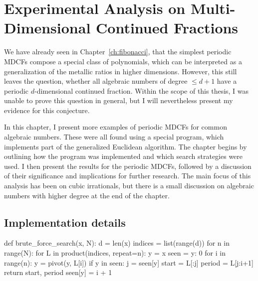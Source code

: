 \chapter{Experimental Analysis on Multi-Dimensional Continued Fractions}
\label{ch:implementation}

We have already seen in Chapter~\ref{ch:fibonacci},
that the simplest periodic MDCFs compose a special class of polynomials,
which can be interpreted as a generalization of the metallic ratios in higher
dimensions.
However, this still leaves the question, whether all algebraic numbers of degree $≤ d+1$
have a periodic $d$-dimensional continued fraction.
Within the scope of this thesis, I was unable to prove this question in
general, but I will nevertheless present my evidence for this conjecture.

In this chapter, I present more examples of periodic MDCFs for common algebraic numbers.
These were all found using a special program, which implements part of the generalized Euclidean algorithm.
The chapter begins by outlining how the program was implemented and which search strategies were used.
I then present the results for the periodic MDCFs, followed by a discussion of
their significance and implications for further research.
The main focus of this analysis has been on cubic irrationals,
but there is a small discussion on algebraic numbers with higher degree at the end of the chapter.

\section{Implementation details}

\begin{Python}[
    float=tbp,
    numbers=left,
    label={lst:bfs},
    caption={
      The implementation of the brute-force search for finding a periodic representation.
      The program iterates over all sequences with a maximum length of $N$
      until it finds a duplicate vector.
    }
  ]
def brute_force_search(x, N):
  d = len(x)
  indices = list(range(d))
  for n in range(N):
    for L in product(indices, repeat=n):
      y = x
      seen = {y: 0}
      for i in range(n):
        y = pivot(y, L[i])
        if y in seen:
          j = seen[y]
          start = L[:j]
          period = L[j:i+1]
          return start, period
        seen[y] = i + 1
\end{Python}

